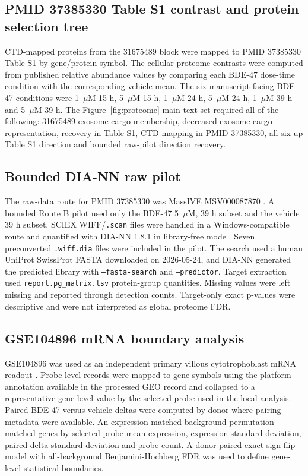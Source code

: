\documentclass[11pt]{article}
\newcommand{\microM}{\ensuremath{\mu\mathrm{M}}}
\begin{document}
\subsection{PMID 37385330 Table S1 contrast and protein selection tree}
CTD-mapped proteins from the 31675489 block were mapped to PMID 37385330 Table S1 by gene/protein symbol. The cellular proteome contrasts were computed from published relative abundance values by comparing each BDE-47 dose-time condition with the corresponding vehicle mean. The six manuscript-facing BDE-47 conditions were 1~\microM{} 15 h, 5~\microM{} 15 h, 1~\microM{} 24 h, 5~\microM{} 24 h, 1~\microM{} 39 h and 5~\microM{} 39 h. The Figure~\ref{fig:proteome} main-text set required all of the following: 31675489 exosome-cargo membership, decreased exosome-cargo representation, recovery in Table S1, CTD mapping in PMID 37385330, all-six-up Table S1 direction and bounded raw-pilot direction recovery.

\subsection{Bounded DIA-NN raw pilot}
The raw-data route for PMID 37385330 was MassIVE MSV000087870 \cite{vizcaino2014,choi2020}. A bounded Route B pilot used only the BDE-47 5~\microM{}, 39 h subset and the vehicle 39 h subset. SCIEX WIFF/\texttt{.scan} files were handled in a Windows-compatible route and quantified with DIA-NN 1.8.1 in library-free mode \cite{demichev2020}. Seven preconverted \texttt{.wiff.dia} files were included in the pilot. The search used a human UniProt SwissProt FASTA downloaded on 2026-05-24, and DIA-NN generated the predicted library with \texttt{--fasta-search} and \texttt{--predictor}. Target extraction used \texttt{report.pg\_matrix.tsv} protein-group quantities. Missing values were left missing and reported through detection counts. Target-only exact p-values were descriptive and were not interpreted as global proteome FDR.

\subsection{GSE104896 mRNA boundary analysis}
GSE104896 was used as an independent primary villous cytotrophoblast mRNA readout \cite{barrett2013,robinson2019}. Probe-level records were mapped to gene symbols using the platform annotation available in the processed GEO record and collapsed to a representative gene-level value by the selected probe used in the local analysis. Paired BDE-47 versus vehicle deltas were computed by donor where pairing metadata were available. An expression-matched background permutation matched genes by selected-probe mean expression, expression standard deviation, paired-delta standard deviation and probe count. A donor-paired exact sign-flip model with all-background Benjamini-Hochberg FDR was used to define gene-level statistical boundaries.
\end{document}
